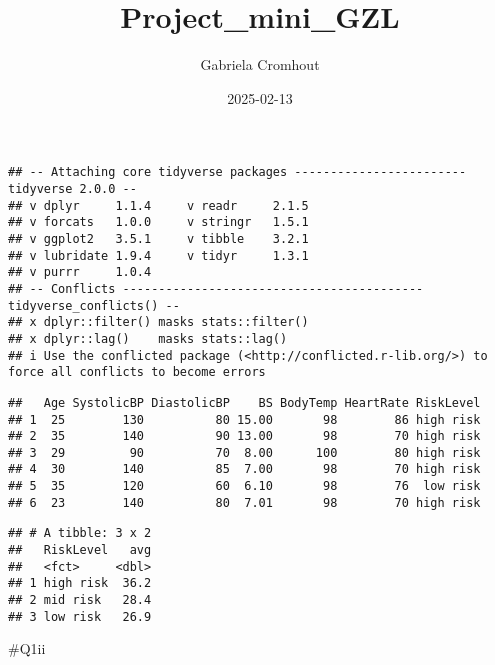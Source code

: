 \documentclass[
  ignorenonframetext,
]{beamer}
\title{Project\_mini\_GZL}
\author{Gabriela Cromhout}
\date{2025-02-13}
\begin{document}
\frame{\titlepage}

\begin{frame}[fragile]
\begin{verbatim}
## -- Attaching core tidyverse packages ------------------------ tidyverse 2.0.0 --
## v dplyr     1.1.4     v readr     2.1.5
## v forcats   1.0.0     v stringr   1.5.1
## v ggplot2   3.5.1     v tibble    3.2.1
## v lubridate 1.9.4     v tidyr     1.3.1
## v purrr     1.0.4     
## -- Conflicts ------------------------------------------ tidyverse_conflicts() --
## x dplyr::filter() masks stats::filter()
## x dplyr::lag()    masks stats::lag()
## i Use the conflicted package (<http://conflicted.r-lib.org/>) to force all conflicts to become errors
\end{verbatim}

\begin{verbatim}
##   Age SystolicBP DiastolicBP    BS BodyTemp HeartRate RiskLevel
## 1  25        130          80 15.00       98        86 high risk
## 2  35        140          90 13.00       98        70 high risk
## 3  29         90          70  8.00      100        80 high risk
## 4  30        140          85  7.00       98        70 high risk
## 5  35        120          60  6.10       98        76  low risk
## 6  23        140          80  7.01       98        70 high risk
\end{verbatim}

\begin{verbatim}
## # A tibble: 3 x 2
##   RiskLevel   avg
##   <fct>     <dbl>
## 1 high risk  36.2
## 2 mid risk   28.4
## 3 low risk   26.9
\end{verbatim}

\#Q1ii


\end{frame}
\end{document}
